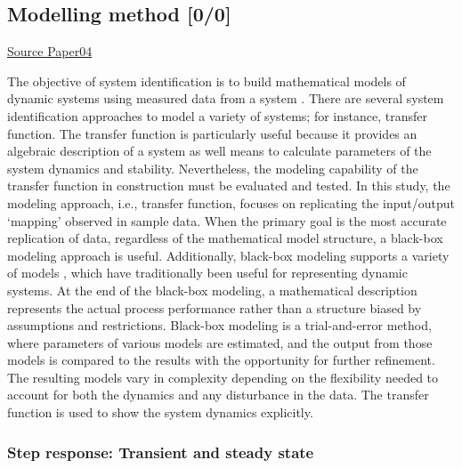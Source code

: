 \documentclass{article}
\begin{document}
\subsection{Modelling method [0/0]}
\label{sec:orgba0ed7a}
\uline{Source Paper04}

The objective of system identification is to build mathematical models of dynamic systems using measured data from a system \citep{Ljung1999}.
There are several system identification approaches to model a variety of systems; for instance, transfer function.
The transfer function is particularly useful because it provides an algebraic description of a system as well means to calculate parameters of the system dynamics and stability.
Nevertheless, the modeling capability of the transfer function in construction must be evaluated and tested.
In this study, the modeling approach, i.e., transfer function, focuses on replicating the input/output `mapping' observed in sample data.
When the primary goal is the most accurate replication of data, regardless of the mathematical model structure, a black-box modeling approach is useful.
Additionally, black-box modeling supports a variety of models \citep{Bapat2011, Billings2013}, which have traditionally been useful for representing dynamic systems.
At the end of the black-box modeling, a mathematical description represents the actual process performance rather than a structure biased by assumptions and restrictions.
Black-box modeling is a trial-and-error method, where parameters of various models are estimated, and the output from those models is compared to the results with the opportunity for further refinement.
The resulting models vary in complexity depending on the flexibility needed to account for both the dynamics and any disturbance in the data.
The transfer function is used to show the system dynamics explicitly.

\subsubsection{Step response: Transient and steady state}
\label{sec:orgcaa8237}
\end{document}
